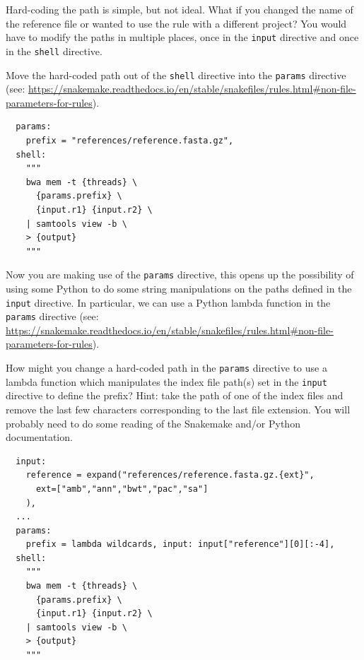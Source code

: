 \begin{questions}

Hard-coding the path is simple, but not ideal.
What if you changed the name of the reference file or wanted to use the rule with a different project?
You would have to modify the paths in multiple places, once in the \texttt{input} directive and once in the \texttt{shell} directive.

Move the hard-coded path out of the \texttt{shell} directive into the \texttt{params} directive (see: \url{https://snakemake.readthedocs.io/en/stable/snakefiles/rules.html#non-file-parameters-for-rules}).

\begin{answer}

\begin{lstlisting}
  params:
    prefix = "references/reference.fasta.gz",
  shell:
    """
    bwa mem -t {threads} \
      {params.prefix} \
      {input.r1} {input.r2} \
    | samtools view -b \
    > {output}
    """
\end{lstlisting}

\end{answer}

\end{questions}

\begin{questions}

Now you are making use of the \texttt{params} directive, this opens up the possibility of using some Python to do some string manipulations on the paths defined in the \texttt{input} directive.
In particular, we can use a Python lambda function in the \texttt{params} directive (see: \url{https://snakemake.readthedocs.io/en/stable/snakefiles/rules.html#non-file-parameters-for-rules}).

How might you change a hard-coded path in the \texttt{params} directive to use a lambda function which manipulates the index file path(s) set in the \texttt{input} directive to define the prefix?
Hint: take the path of one of the index files and remove the last few characters corresponding to the last file extension.
You will probably need to do some reading of the Snakemake and/or Python documentation.

\begin{answer}

\begin{lstlisting}
  input:
    reference = expand("references/reference.fasta.gz.{ext}",
      ext=["amb","ann","bwt","pac","sa"]
    ),
  ...
  params:
    prefix = lambda wildcards, input: input["reference"][0][:-4],
  shell:
    """
    bwa mem -t {threads} \
      {params.prefix} \
      {input.r1} {input.r2} \
    | samtools view -b \
    > {output}
    """
\end{lstlisting}

\end{answer}

\end{questions}


